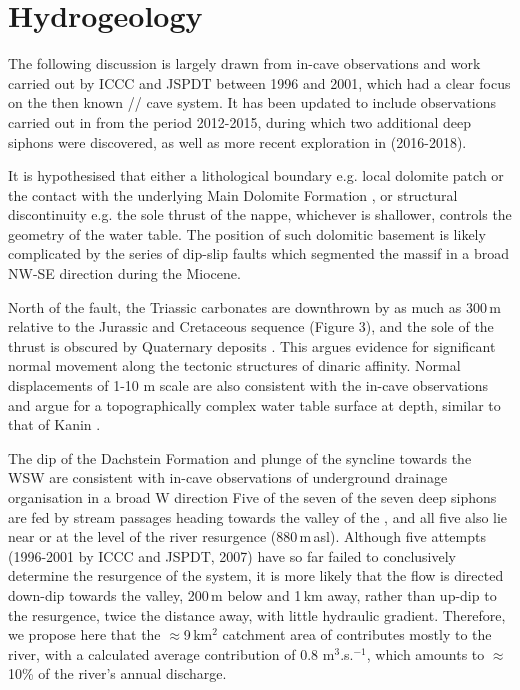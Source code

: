 \section{Hydrogeology}
The following discussion is largely drawn from in-cave observations and work carried out by ICCC and JSPDT between 1996 and 2001, which had a clear focus on the then known // cave system. 
It has been updated to include observations carried out in  from the period 2012-2015, during which two additional deep siphons were discovered, as well as more recent exploration in  (2016-2018).

It is hypothesised that either a lithological boundary e.g. local dolomite patch or the contact with the underlying Main Dolomite Formation \citep{ogorelec1996dachstein}, or structural discontinuity e.g. the sole thrust of the  nappe, whichever is shallower, controls the geometry of the water table. 
The position of such dolomitic basement is likely complicated by the series of dip-slip faults which segmented the massif in a broad NW-SE direction during the Miocene.

North of the  fault, the Triassic carbonates are downthrown by as much as 300\,m relative to the Jurassic and Cretaceous sequence (Figure 3), and the sole of the thrust is obscured by Quaternary deposits \citep{buser1986tolmavc,hm1}. 
This argues evidence for significant normal movement along the tectonic structures of dinaric affinity. 
Normal displacements of 1-10 m scale are also consistent with the in-cave observations and argue for a topographically complex water table surface at depth, similar to that of Kanin \citep{kunaver1983geomorf,audra2000karst}.

The dip of the Dachstein Formation and plunge of the syncline towards the WSW are consistent with in-cave observations of underground drainage organisation in a broad W direction
Five of the seven of the seven deep siphons are fed by stream passages heading towards the valley of the , and all five also lie near or at the level of the  river resurgence (880\,m\,asl). 
Although five attempts (1996-2001 by ICCC and JSPDT, 2007) have so far failed to conclusively determine the resurgence of the  system, it is more likely that the flow is directed down-dip towards the  valley, 200\,m below and 1\,km away, rather than up-dip to the  resurgence,  twice the distance away, with little hydraulic gradient. 
Therefore, we propose here that the $\approx$9\,km$^2$ catchment area of  contributes mostly to the  river,  with a calculated  average contribution of 0.8 m$^3$.s.$^{-1}$, which amounts to $\approx$10\% of the river’s annual discharge. 

